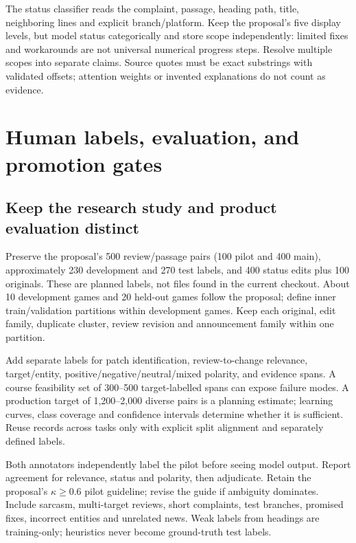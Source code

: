 \documentclass[10pt,letterpaper]{article}
\newcommand{\nextsection}[1]{\clearpage\section{#1}}
\begin{document}
The status classifier reads the complaint, passage, heading path, title, neighboring lines and explicit branch/platform. Keep the proposal's five display levels, but model status categorically and store scope independently: limited fixes and workarounds are not universal numerical progress steps. Resolve multiple scopes into separate claims. Source quotes must be exact substrings with validated offsets; attention weights or invented explanations do not count as evidence.

\nextsection{Human labels, evaluation, and promotion gates}
\subsection{Keep the research study and product evaluation distinct}
Preserve the proposal's 500 review/passage pairs (100 pilot and 400 main), approximately 230 development and 270 test labels, and 400 status edits plus 100 originals. These are planned labels, not files found in the current checkout. About 10 development games and 20 held-out games follow the proposal; define inner train/validation partitions within development games. Keep each original, edit family, duplicate cluster, review revision and announcement family within one partition.

Add separate labels for patch identification, review-to-change relevance, target/entity, positive/negative/neutral/mixed polarity, and evidence spans. A course feasibility set of 300--500 target-labelled spans can expose failure modes. A production target of 1,200--2,000 diverse pairs is a planning estimate; learning curves, class coverage and confidence intervals determine whether it is sufficient. Reuse records across tasks only with explicit split alignment and separately defined labels.

Both annotators independently label the pilot before seeing model output. Report agreement for relevance, status and polarity, then adjudicate. Retain the proposal's $\kappa \geq 0.6$ pilot guideline; revise the guide if ambiguity dominates. Include sarcasm, multi-target reviews, short complaints, test branches, promised fixes, incorrect entities and unrelated news. Weak labels from headings are training-only; heuristics never become ground-truth test labels.
\end{document}

